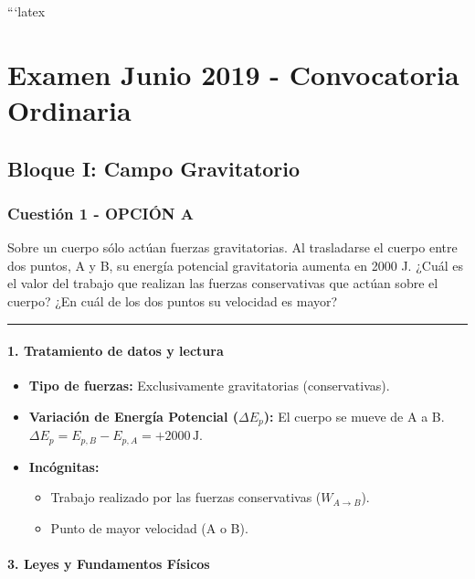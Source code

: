 ```latex
\chapter{Examen Junio 2019 - Convocatoria Ordinaria}
\label{chap:2019_jun_ord}

\section{Bloque I: Campo Gravitatorio}
\label{sec:grav_2019_jun_ord}

\subsection{Cuestión 1 - OPCIÓN A}
\label{subsec:1A_2019_jun_ord}

\begin{cajaenunciado}
Sobre un cuerpo sólo actúan fuerzas gravitatorias. Al trasladarse el cuerpo entre dos puntos, A y B, su energía potencial gravitatoria aumenta en 2000 J. ¿Cuál es el valor del trabajo que realizan las fuerzas conservativas que actúan sobre el cuerpo? ¿En cuál de los dos puntos su velocidad es mayor?
\end{cajaenunciado}
\hrule

\subsubsection*{1. Tratamiento de datos y lectura}
\begin{itemize}
    \item \textbf{Tipo de fuerzas:} Exclusivamente gravitatorias (conservativas).
    \item \textbf{Variación de Energía Potencial ($\Delta E_p$):} El cuerpo se mueve de A a B. $\Delta E_p = E_{p,B} - E_{p,A} = +2000 \, \text{J}$.
    \item \textbf{Incógnitas:}
    \begin{itemize}
        \item Trabajo realizado por las fuerzas conservativas ($W_{A \to B}$).
        \item Punto de mayor velocidad (A o B).
    \end{itemize}
\end{itemize}

\subsubsection*{3. Leyes y Fundamentos Físicos}
